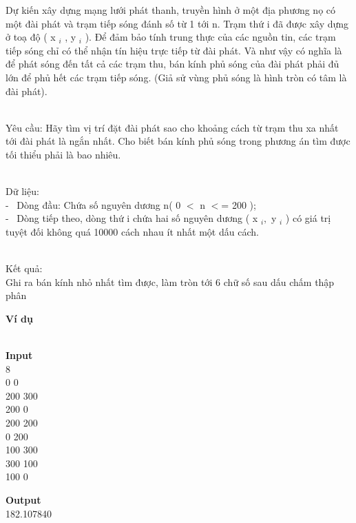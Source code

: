 

Dự kiến xây dựng mạng lưới phát thanh, truyền hình ở một địa phương nọ có một đài phát và trạm tiếp sóng đánh số từ 1 tới n. Trạm thứ i đã được xây dựng ở toạ độ ( x $_ i $ , y $_ i $ ). Để đảm bảo tính trung thực của các nguồn tin, các trạm tiếp sóng chỉ có thể nhận tín hiệu trực tiếp từ đài phát. Và như vậy có nghĩa là để phát sóng đến tất cả các trạm thu, bán kính phủ sóng của đài phát phải đủ lớn để phủ hết các trạm tiếp sóng. (Giả sử vùng phủ sóng là hình tròn có tâm là đài phát).


\\Yêu cầu: Hãy tìm vị trí đặt đài phát sao cho khoảng cách từ trạm thu xa nhất tới đài phát là ngắn nhất. Cho biết bán kính phủ sóng trong phương án tìm được tối thiểu phải là bao nhiêu.


\\Dữ liệu:
\\-  Dòng đầu: Chứa số nguyên dương n( 0 $<$ n $<$= 200 );
\\-  Dòng tiếp theo, dòng thứ i chứa hai số nguyên dương ( x $_ i , $ y $_ i $ ) có giá trị tuyệt đối không quá 10000 cách nhau ít nhất một dấu cách.


\\Kết quả:
\\Ghi ra bán kính nhỏ nhất tìm được, làm tròn tới 6 chữ số sau dấu chấm thập phân

\textbf{Ví dụ }


\\\textbf{Input}
\\8
\\0 0
\\200 300
\\200 0
\\200 200
\\0 200
\\100 300
\\300 100
\\100 0\textbf{}

\textbf{Output}
\\182.107840